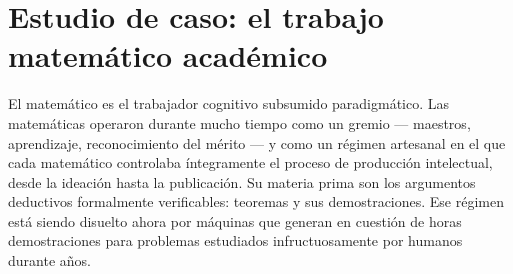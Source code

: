 \documentclass[11pt]{article}
\begin{document}
\section{Estudio de caso: el trabajo matemático académico}

El matemático es el trabajador cognitivo subsumido paradigmático. Las
matemáticas operaron durante mucho tiempo como un gremio --- maestros,
aprendizaje, reconocimiento del mérito --- y como un régimen artesanal
en el que cada matemático controlaba íntegramente el proceso de
producción intelectual, desde la ideación hasta la publicación. Su
materia prima son los argumentos deductivos formalmente verificables:
teoremas y sus demostraciones. Ese régimen está siendo disuelto ahora por
máquinas que generan en cuestión de horas demostraciones para problemas
estudiados infructuosamente por humanos durante años.
\end{document}
